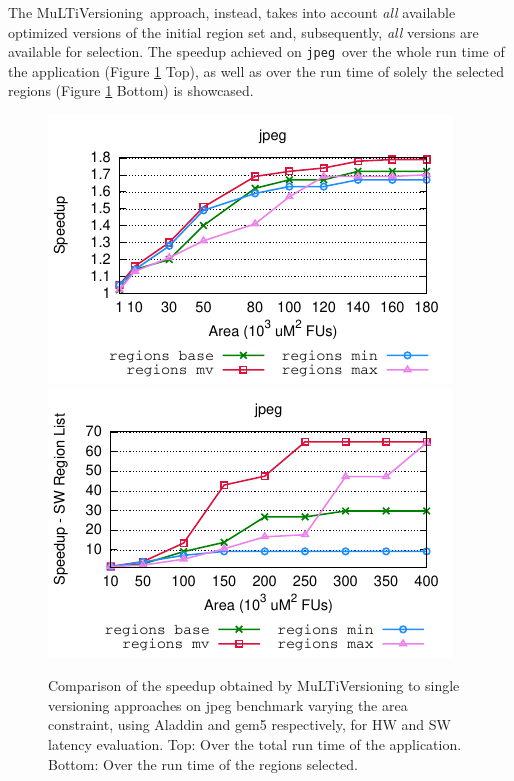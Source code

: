 \documentclass[]{usiinfthesis}
\newcommand{\multi}{MuLTiVersioning}
\newcommand{\jpeg}{\texttt{jpeg}}
\begin{document}
The \multi\ approach, instead, takes into account \emph{all} available optimized versions of the initial region set and, subsequently, \emph{all} versions are available for selection.
The speedup achieved on \jpeg\ over the whole run time of the application (Figure \ref{fig:mlv_aladdin} 
Top), as well as over the run time of solely the selected regions (Figure \ref{fig:mlv_aladdin} Bottom) is 
showcased.

\begin{figure}[h]
\centering
\hspace*{-1cm}
\includegraphics[width= 0.6 \linewidth]{figs/plot_O3CPU}
\hspace*{-1cm}
\includegraphics[width= 0.6 \linewidth]{figs/plot_O3CPU_SW_large}
\caption{Comparison of the speedup obtained by MuLTiVersioning to single 
versioning approaches on jpeg benchmark
varying the area constraint, using Aladdin and gem5 respectively, for HW and 
SW latency evaluation.
Top: Over the
total run time of the application. Bottom: Over the run time of the regions 
selected.  
}
\label{fig:mlv_aladdin}
\end{figure}
\end{document}
